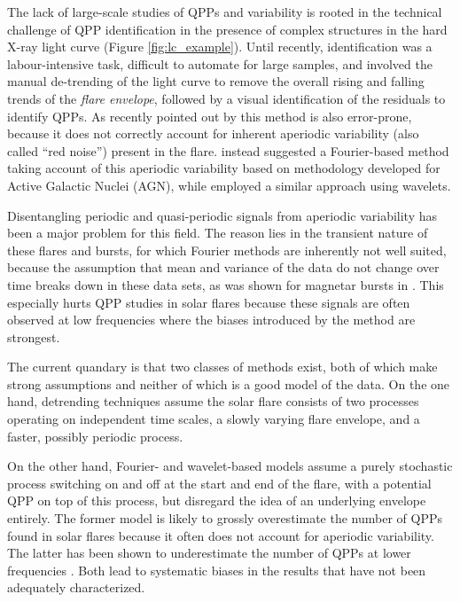 \documentclass{aastex61}
\begin{document}
The lack of large-scale studies of QPPs and variability is rooted in the technical challenge of QPP identification in the presence of complex structures in the hard X-ray light curve (Figure \ref{fig:lc_example}). 
Until recently, identification was a labour-intensive task, difficult to automate for large samples, and involved the manual de-trending of the light curve to remove the overall rising and falling trends of the \textit{flare envelope}, followed by a visual identification of the residuals to identify QPPs. 
As recently pointed out by \citep{inglis2015} this method is also error-prone, because it does not correctly account for inherent aperiodic variability (also called ``red noise'') present in the flare.
\citep{inglis2015} instead suggested a Fourier-based method taking account of this aperiodic variability based on methodology developed for Active Galactic Nuclei (AGN), while \citep{simoes2015} employed a similar approach using wavelets. 

Disentangling periodic and quasi-periodic signals from aperiodic variability has been a major problem for this field. 
The reason lies in the transient nature of these flares and bursts, for which Fourier methods are inherently not well suited, because the assumption that mean and variance of the data do not change over time breaks down in these data sets, as was shown for magnetar bursts in . 
This especially hurts QPP studies in solar flares because these signals are often observed at low frequencies where the biases introduced by the method are strongest. 

The current quandary is that two classes of methods exist, both of which make strong assumptions and neither of which is a good model of the data. On the one hand, detrending techniques assume the solar flare consists of two processes operating on independent time scales, a slowly varying flare envelope, and a faster, possibly periodic process. 

On the other hand, Fourier- and wavelet-based models assume a purely stochastic process switching on and off at the start and end of the flare, with a potential QPP on top of this process, but disregard the idea of an underlying envelope entirely. 
The former model is likely to grossly overestimate the number of QPPs found in solar flares because it often does not account for aperiodic variability. The latter has been shown to underestimate the number of QPPs at lower frequencies \citep{huppenkothen2013}. 
Both lead to systematic biases in the results that have not been adequately characterized.
\end{document}
